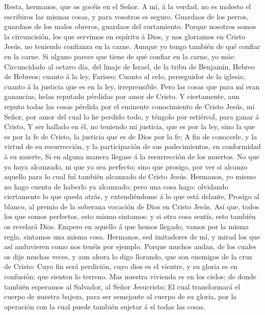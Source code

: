  Resta, hermanos, que os gocéis en el Señor. A mí, á la
verdad, no es molesto el escribiros las mismas cosas, y para vosotros es
seguro.  Guardaos de los perros, guardaos de los malos
obreros, guardaos del cortamiento.  Porque nosotros somos
la circuncisión, los que servimos en espíritu á Dios, y nos gloriamos en
Cristo Jesús, no teniendo confianza en la carne.  Aunque
yo tengo también de qué confiar en la carne. Si alguno parece que tiene
de qué confiar en la carne, yo más:  Circuncidado al
octavo día, del linaje de Israel, de la tribu de Benjamín, Hebreo de
Hebreos; cuanto á la ley, Fariseo;  Cuanto al celo,
perseguidor de la iglesia; cuanto á la justicia que es en la ley,
irreprensible.  Pero las cosas que para mí eran ganancias,
helas reputado pérdidas por amor de Cristo.  Y
ciertamente, aun reputo todas las cosas pérdida por el eminente
conocimiento de Cristo Jesús, mi Señor, por amor del cual lo he perdido
todo, y téngolo por estiércol, para ganar á Cristo,  Y ser
hallado en él, no teniendo mi justicia, que es por la ley, sino la que
es por la fe de Cristo, la justicia que es de Dios por la fe;
 A fin de conocerle, y la virtud de su resurrección, y la
participación de sus padecimientos, en conformidad á su muerte,
 Si en alguna manera llegase á la resurrección de los
muertos.  No que ya haya alcanzado, ni que ya sea
perfecto; sino que prosigo, por ver si alcanzo aquello para lo cual fuí
también alcanzado de Cristo Jesús.  Hermanos, yo mismo no
hago cuenta de haberlo ya alcanzado; pero una cosa hago: olvidando
ciertamente lo que queda atrás, y extendiéndome á lo que está delante,
 Prosigo al blanco, al premio de la soberana vocación de
Dios en Cristo Jesús.  Así que, todos los que somos
perfectos, esto mismo sintamos: y si otra cosa sentís, esto también os
revelará Dios.  Empero en aquello á que hemos llegado,
vamos por la misma regla, sintamos una misma cosa. 
Hermanos, sed imitadores de mí, y mirad los que así anduvieren como nos
tenéis por ejemplo.  Porque muchos andan, de los cuales
os dije muchas veces, y aun ahora lo digo llorando, que son enemigos de
la cruz de Cristo:  Cuyo fin será perdición, cuyo dios es
el vientre, y su gloria es en confusión; que sienten lo terreno.
 Mas nuestra vivienda es en los cielos; de donde también
esperamos al Salvador, al Señor Jesucristo;  El cual
transformará el cuerpo de nuestra bajeza, para ser semejante al cuerpo
de su gloria, por la operación con la cual puede también sujetar á sí
todas las cosas.

